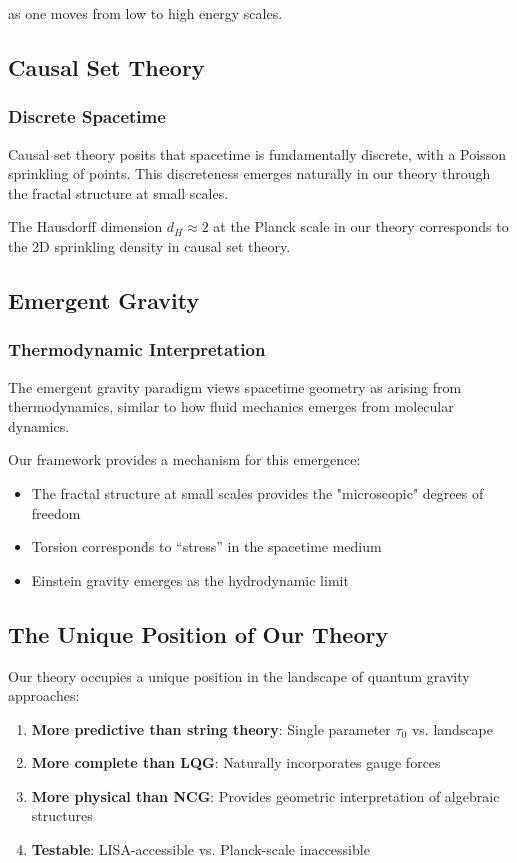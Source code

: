 as one moves from low to high energy scales.

\subsection{Causal Set Theory}

\subsubsection{Discrete Spacetime}

Causal set theory posits that spacetime is fundamentally discrete, with a Poisson sprinkling of points. This discreteness emerges naturally in our theory through the fractal structure at small scales.

The Hausdorff dimension $d_H \approx 2$ at the Planck scale in our theory corresponds to the 2D sprinkling density in causal set theory.

\subsection{Emergent Gravity}

\subsubsection{Thermodynamic Interpretation}

The emergent gravity paradigm views spacetime geometry as arising from thermodynamics, similar to how fluid mechanics emerges from molecular dynamics.

Our framework provides a mechanism for this emergence:
\begin{itemize}
    \item The fractal structure at small scales provides the "microscopic" degrees of freedom
    \item Torsion corresponds to ``stress'' in the spacetime medium
    \item Einstein gravity emerges as the hydrodynamic limit
\end{itemize}

\subsection{The Unique Position of Our Theory}

Our theory occupies a unique position in the landscape of quantum gravity approaches:

\begin{enumerate}
    \item \textbf{More predictive than string theory}: Single parameter $\tau_0$ vs. landscape
    \item \textbf{More complete than LQG}: Naturally incorporates gauge forces
    \item \textbf{More physical than NCG}: Provides geometric interpretation of algebraic structures
    \item \textbf{Testable}: LISA-accessible vs. Planck-scale inaccessible
\end{enumerate}

